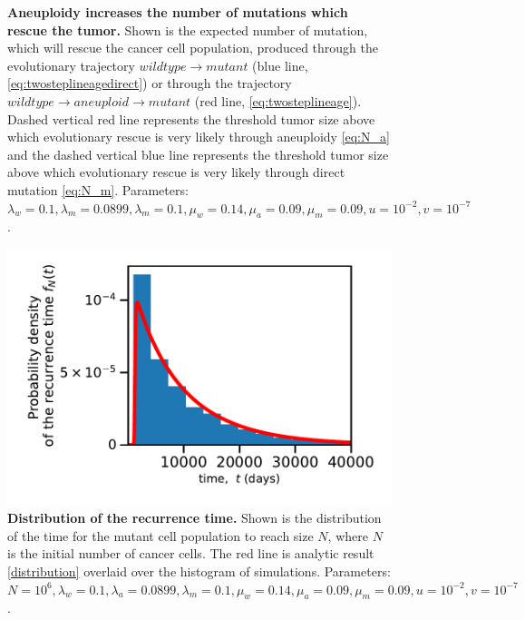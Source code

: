 \documentclass[12pt]{extarticle}
\begin{document}
\begin{appendices}
\begin{figure}
\caption{\textbf{Aneuploidy increases the number of mutations which rescue the tumor.} Shown is the expected number of mutation, which will rescue the cancer cell population, produced through the evolutionary trajectory $wildtype \rightarrow mutant$ (blue line, \cref{eq:twosteplineagedirect}) or through the trajectory $wildtype \rightarrow aneuploid \rightarrow mutant$ (red line, \cref{eq:twosteplineage}). Dashed vertical red line represents the threshold tumor size above which evolutionary rescue is very likely through aneuploidy \cref{eq:N_a} and the dashed vertical blue line represents the threshold tumor size above which evolutionary rescue is very likely through direct mutation \cref{eq:N_m}.
Parameters: $\lambda_w=0.1,\lambda_m=0.0899,\lambda_m=0.1,\mu_w=0.14,\mu_a=0.09,\mu_m=0.09, u=10^{-2}, v=10^{-7}$.}
\label{ExpectedNumberRescueLineages}
\end{figure}
\begin{figure}
\vspace*{1\baselineskip}
\includegraphics[width=1\textwidth]{Figures/KaplanMeierDistribution.pdf}
\caption{\textbf{Distribution of the recurrence time.}
Shown is the distribution of the time for the mutant cell population to reach size $N$, where $N$ is the initial number of cancer cells. The red line is analytic result \cref{distribution} overlaid over the histogram of simulations. 
Parameters: $N=10^6, \lambda_w=0.1,\lambda_a=0.0899,\lambda_m=0.1,\mu_w=0.14,\mu_a=0.09,\mu_m=0.09, u=10^{-2}, v=10^{-7}$.}
\label{KMdistribution}
\end{figure}
\begin{figure}

\end{figure}
\end{appendices}
\end{document}
